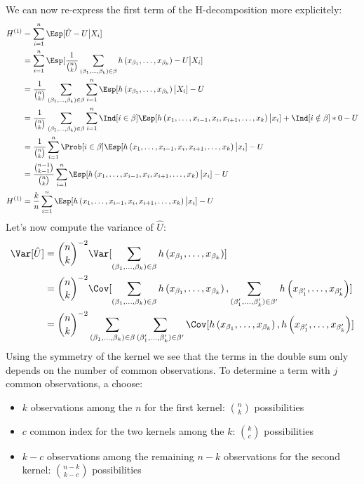 \documentclass[12pt]{article}
\begin{document}
We can now re-express the first term of the H-decomposition more
explicitely:
\begin{align*}
H^{(1)} &= \sum_{i=1}^n \Esp[\hat{U}-U \big| X_i]  \\
&=  \sum_{i=1}^n \Esp[ \frac{1}{{n \choose k}} \sum_{(\beta_1,\ldots,\beta_k) \in \beta} h \left(x_{\beta_1},\ldots,x_{\beta_k} \right) - U \big| X_i ] \\
&=  \frac{1}{{n \choose k}} \sum_{(\beta_1,\ldots,\beta_k) \in \beta} \sum_{i=1}^n \Esp[ h \left(x_{\beta_1},\ldots,x_{\beta_k} \right) \big| X_i ] - U \\
&=  \frac{1}{{n \choose k}} \sum_{(\beta_1,\ldots,\beta_k) \in \beta} \sum_{i=1}^n \Ind[i \in \beta] \Esp[ h \left(x_1,\ldots,x_{i-1},x_i,x_{i+1},\ldots,x_{k} \right) \big| x_i] + \Ind[i \notin \beta] * 0 - U \\
&=  \frac{1}{{n \choose k}} \sum_{i=1}^n \Prob[i \in \beta] \Esp[ h \left(x_1,\ldots,x_{i-1},x_i,x_{i+1},\ldots,x_{k} \right) \big| x_i] - U  \\
&=  \frac{{n - 1 \choose k - 1}}{{n \choose k}} \sum_{i=1}^n \Esp[ h \left(x_1,\ldots,x_{i-1},x_i,x_{i+1},\ldots,x_{k} \right) \big| x_i] - U  \\
H^{(1)} &=  \frac{k}{n} \sum_{i=1}^n \Esp[ h \left(x_1,\ldots,x_{i-1},x_i,x_{i+1},\ldots,x_{k} \right) \big| x_i] - U 
\end{align*}
Let's now compute the variance of \(\hat{U}\):
\begin{align*}
 \Var[\hat{U}] &= {n \choose k}^{-2} \Var[\sum_{(\beta_1,\ldots,\beta_k) \in \beta} h \left(x_{\beta_1},\ldots,x_{\beta_k} \right)] \\
&= {n \choose k}^{-2} \Cov[\sum_{(\beta_1,\ldots,\beta_k) \in \beta} h \left(x_{\beta_1},\ldots,x_{\beta_k} \right),\sum_{(\beta'_1,\ldots,\beta'_k) \in \beta'} h \left(x_{\beta'_1},\ldots,x_{\beta'_k} \right)] \\
&= {n \choose k}^{-2} \sum_{(\beta_1,\ldots,\beta_k) \in \beta} \sum_{(\beta'_1,\ldots,\beta'_k) \in \beta'} \Cov[ h \left(x_{\beta_1},\ldots,x_{\beta_k} \right), h \left(x_{\beta'_1},\ldots,x_{\beta'_k} \right)] \\
 \end{align*}
Using the symmetry of the kernel we see that the terms in the double
sum only depends on the number of common observations. To determine a
term with \(j\) common observations, a choose:
\begin{itemize}
\item \(k\) observations among the \(n\) for the first kernel: \({n \choose k}\) possibilities
\item \(c\) common index for the two kernels among the \(k\): \({k \choose c}\) possibilities
\item \(k-c\) observations among the remaining \(n-k\) observations for
the second kernel: \({n - k \choose k - c}\) possibilities
\end{itemize}
\end{document}
